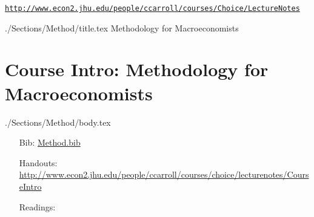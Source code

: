 \documentclass{econtex}
\begin{document}
\texttt{\href{http://www.econ2.jhu.edu/people/ccarroll/courses/Choice/LectureNotes}{http://www.econ2.jhu.edu/people/ccarroll/courses/Choice/LectureNotes}}

\pagebreak


\begin{verbatimwrite}{./Sections/Method/title.tex}
Methodology for Macroeconomists
\end{verbatimwrite}
\section{Course Intro: Methodology for Macroeconomists}

\begin{verbatimwrite}{./Sections/Method/body.tex}

\begin{itemize}
\item[Bib:] \href{http://www.econ2.jhu.edu/people/ccarroll/courses/choice/Syllabus/Method.bib}{Method.bib}
\item[Handouts:]  \url{http://www.econ2.jhu.edu/people/ccarroll/courses/choice/lecturenotes/CourseIntro}
\item[Readings:]
\end{itemize}


\begin{itemize} 
\reqd \cite{summersIllusion}  
\reqd \cite{acemogluCrisis}   
\reqd \cite{keynesMaster}      
\reqd \cite{krugmanHistory}   
\reqd \cite{caballeroPretense}
\reqd \cite{rodrikRules}      
\reqd \cite{barberaFight}     
\reqd \cite{romerTrouble}
\reqd \cite{kocherlakotaTrouble}
\end{itemize}

\end{verbatimwrite}



\ifPost
{} 
\fi
\end{document}
